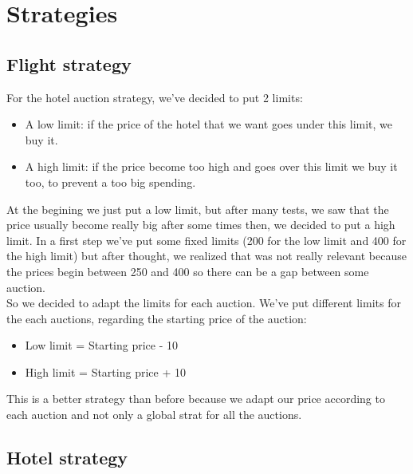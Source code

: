 \section{Strategies}

\subsection{Flight strategy}

For the hotel auction strategy, we've decided to put 2 limits:\\
\begin{itemize}
\item A low limit: if the price of the hotel that we want goes under this limit, we buy it.
\item A high limit: if the price become too high and goes over this limit we buy it too, to prevent a too big spending.
\end{itemize}
At the begining we just put a low limit, but after many tests, we saw that the price usually become really big after some times then, we decided to put a high limit.
In a first step we've put some fixed limits (200 for the low limit and 400 for the high limit) but after thought, we realized that was not really relevant because the prices begin between 250 and 400 so there can be a gap between some auction.\\
So we decided to adapt the limits for each auction. We've put different limits for the each auctions, regarding the starting price of the auction:\\
\begin{itemize}
\item Low limit = Starting price - 10%
\item High limit = Starting price + 10%
\end{itemize}
This is a better strategy than before because we adapt our price according to each auction and not only a global strat for all the auctions.

\subsection{Hotel strategy}

